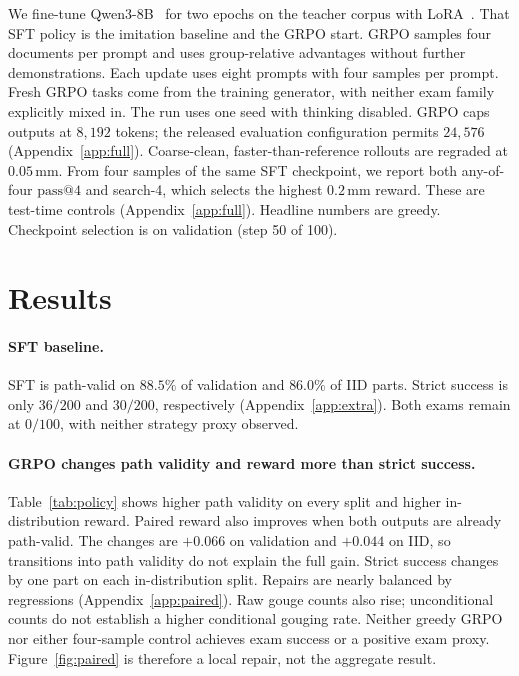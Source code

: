 \documentclass{article}
\makeatletter
\newcommand{\passat}[1]{\mathrm{pass}@#1}
\makeatother
\begin{document}
We fine-tune Qwen3-8B~\citep{yang2025qwen3} for two epochs on the
teacher corpus with LoRA~\citep{hu2022lora}.  That SFT policy is the
imitation baseline and the GRPO start.  GRPO samples four documents per
prompt and uses group-relative advantages without further
demonstrations.  Each update uses eight prompts with four samples per
prompt. Fresh GRPO tasks come from the training generator, with neither
exam family explicitly mixed in. The run uses one seed with thinking
disabled. GRPO caps outputs at $8{,}192$ tokens; the released evaluation
configuration permits $24{,}576$ (Appendix~\ref{app:full}).
Coarse-clean, faster-than-reference rollouts are regraded at
$0.05$\,mm.  From four samples of the same SFT checkpoint, we report
both any-of-four $\passat{4}$ and search-4, which selects the highest
$0.2$\,mm reward.  These are test-time controls
(Appendix~\ref{app:full}).
Headline numbers are greedy.  Checkpoint selection is on validation
(step 50 of 100).

\section{Results}
\label{sec:results}

\paragraph{SFT baseline.}
SFT is path-valid on $88.5\%$ of validation and $86.0\%$ of IID
parts.  Strict success is only $36/200$ and $30/200$, respectively
(Appendix~\ref{app:extra}).  Both exams remain at $0/100$, with neither
strategy proxy observed.

\paragraph{GRPO changes path validity and reward more than strict success.}
Table~\ref{tab:policy} shows higher path validity on every split and
higher in-distribution reward.  Paired reward also improves when both
outputs are already path-valid.  The changes are $+0.066$ on validation
and $+0.044$ on IID, so transitions into path validity do not explain
the full gain.  Strict success changes by one part on each
in-distribution split.  Repairs are nearly balanced by regressions
(Appendix~\ref{app:paired}). Raw gouge counts also rise; unconditional
counts do not establish a higher conditional gouging rate. Neither
greedy GRPO nor either four-sample control achieves exam success or a
positive exam proxy. Figure~\ref{fig:paired} is therefore
a local repair, not the aggregate result.
\end{document}
